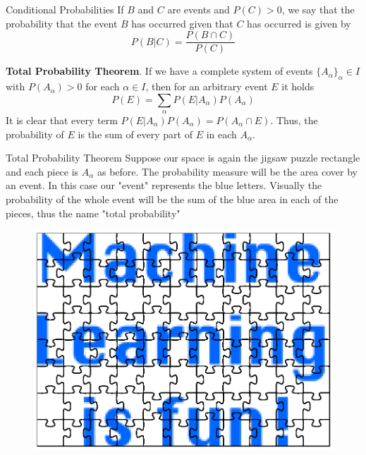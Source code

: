 \documentclass{beamer}
\begin{document}
\begin{frame}{Conditional Probabilities}
	If $B$ and $C$ are events and $P(C)>0$, we say that the probability that the event $B$ has occurred given that $C$ has occurred is given by 
	\begin{equation*}
		P(B|C) = \frac{P(B\cap C)}{P(C)}		
	\end{equation*}	

{\bf Total Probability Theorem}. 
If we have a complete system of events $\{A_\alpha\}_\alpha\in I$ with $P(A_\alpha)>0$ for each $\alpha \in I$, then for an arbitrary event $E$ it holds
\begin{equation*}
	P(E) = \sum_{\alpha} P(E|A_\alpha)P(A_\alpha)
\end{equation*}
It is clear that every term $P(E|A_\alpha)P(A_\alpha)=P(A_\alpha \cap E)$. Thus, the probability of $E$ is the sum of every part of $E$ in each $A_\alpha$.
\end{frame}
\begin{frame}{Total Probability Theorem}
Suppose our space is again the jigsaw puzzle rectangle and each piece is $A_\alpha$ as before. The probability measure will be the area cover by an event. In this case our "event" represents the blue letters. Visually the probability of the whole event will be the sum of the blue area in each of the pieces, thus the name "total probability"

 \begin{figure}[h]
	\centering
	\includegraphics[scale=0.5]{../../Figures/fig_ml_is_fun.png}
\end{figure}

\end{frame}
\end{document}
